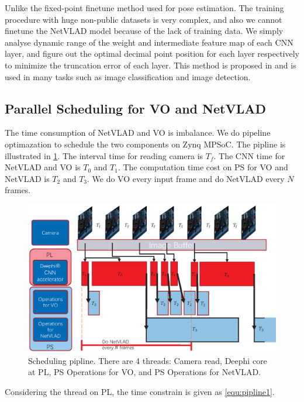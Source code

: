 Unlike the fixed-point finetune method used for pose estimation. The training procedure with huge non-public datasets is very complex, and also we cannot finetune the NetVLAD model because of the lack of training data. We simply analyse dynamic range of the weight and intermediate feature map of each CNN layer, and figure out the optimal decimal point position for each layer respectively to minimize the truncation error of each layer.
This method is proposed in \cite{Qiu:2016151} and is used in many tasks such as image classification and image detection.

\subsection{Parallel Scheduling for VO and NetVLAD}

The time consumption of NetVLAD and VO is imbalance. We do pipeline optimazation to schedule the two components on Zynq MPSoC. The pipline is illustrated in \cref{fig:pipline}. The interval time for reading camera is $T_{f}$. The CNN time for NetVLAD and VO is $T_{0}$ and $T_{1}$. The computation time cost on PS for VO and NetVLAD is $T_{2}$ and $T_{3}$. We do VO every input frame and do NetVLAD every $N$ frames.

\begin{figure}[t]
    \centering  
    \includegraphics[width=0.95\linewidth]{fig/pipeline.eps}
    \caption{Scheduling pipline. There are 4 threads: Camera read, Deephi core at PL, PS Operations for VO, and PS Operations for NetVLAD.}
    \label{fig:pipline}
\end{figure}


Considering the thread on PL, the time constrain is given as \cref{equ:pipline1}. 

